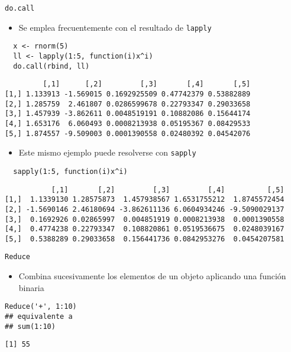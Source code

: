 \documentclass[xcolor={usenames,svgnames,dvipsnames}]{beamer}
\begin{document}
\begin{frame}[fragile,label={sec:orgheadline29}]{\texttt{do.call}}
 \begin{itemize}
\item Se emplea frecuentemente con el resultado de \texttt{lapply}
\end{itemize}
\lstset{language=R,label= ,caption= ,captionpos=b,numbers=none}
\begin{lstlisting}
  x <- rnorm(5)
  ll <- lapply(1:5, function(i)x^i)
  do.call(rbind, ll)
\end{lstlisting}

\begin{verbatim}
         [,1]      [,2]         [,3]       [,4]       [,5]
[1,] 1.133913 -1.569015 0.1692925509 0.47742379 0.53882889
[2,] 1.285759  2.461807 0.0286599678 0.22793347 0.29033658
[3,] 1.457939 -3.862611 0.0048519191 0.10882086 0.15644174
[4,] 1.653176  6.060493 0.0008213938 0.05195367 0.08429533
[5,] 1.874557 -9.509003 0.0001390558 0.02480392 0.04542076
\end{verbatim}

\begin{itemize}
\item Este mismo ejemplo puede resolverse con \texttt{sapply}
\end{itemize}
\lstset{language=R,label= ,caption= ,captionpos=b,numbers=none}
\begin{lstlisting}
  sapply(1:5, function(i)x^i)
\end{lstlisting}

\begin{verbatim}
           [,1]       [,2]         [,3]         [,4]          [,5]
[1,]  1.1339130 1.28575873  1.457938567 1.6531755212  1.8745572454
[2,] -1.5690146 2.46180694 -3.862611136 6.0604934246 -9.5090029137
[3,]  0.1692926 0.02865997  0.004851919 0.0008213938  0.0001390558
[4,]  0.4774238 0.22793347  0.108820861 0.0519536675  0.0248039167
[5,]  0.5388289 0.29033658  0.156441736 0.0842953276  0.0454207581
\end{verbatim}
\end{frame}

\begin{frame}[fragile,label={sec:orgheadline30}]{\texttt{Reduce}}
 \begin{itemize}
\item Combina sucesivamente los elementos de un objeto aplicando una
función binaria
\end{itemize}
\lstset{language=R,label= ,caption= ,captionpos=b,numbers=none}
\begin{lstlisting}
Reduce('+', 1:10)
## equivalente a 
## sum(1:10)
\end{lstlisting}

\begin{verbatim}
[1] 55
\end{verbatim}
\end{frame}
\end{document}
